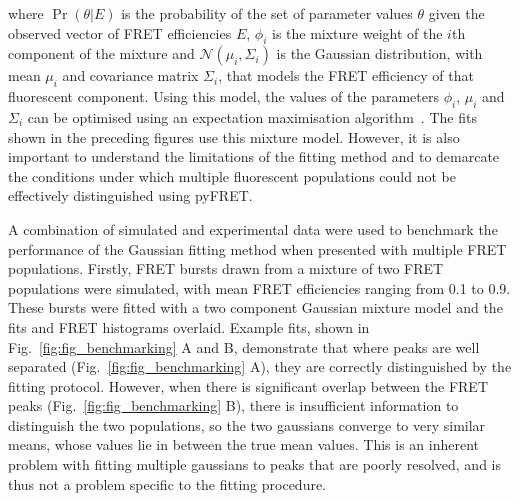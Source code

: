 where $\Pr(\theta|E)$ is the probability of the set of parameter values $\theta$ given the observed vector of FRET efficiencies $E$, $\phi_i$ is the mixture weight of the $i$th component of the mixture and $\mathcal{N}(\mu_i, \Sigma_i)$ is the Gaussian distribution, with mean $\mu_i$ and covariance matrix $\Sigma_i$, that models the FRET efficiency of that fluorescent component. Using this model, the values of the parameters $\phi_i$, $\mu_i$ and $\Sigma_i$ can be optimised using an expectation maximisation algorithm~\cite{Guoshen2012}. The fits shown in the preceding figures use this mixture model. However, it is also important to understand the limitations of the fitting method and to demarcate the conditions under which multiple fluorescent populations could not be effectively distinguished using pyFRET. 

A combination of simulated and experimental data were used to benchmark the performance of the Gaussian fitting method when presented with multiple FRET populations. Firstly, FRET bursts drawn from a mixture of two FRET populations were simulated, with mean FRET efficiencies ranging from 0.1 to 0.9. These bursts were fitted with a two component Gaussian mixture model and the fits and FRET histograms overlaid. Example fits, shown in Fig.~\ref{fig:fig_benchmarking} A and B, demonstrate that where peaks are well separated (Fig.~\ref{fig:fig_benchmarking} A), they are correctly distinguished by the fitting protocol. However, when there is significant overlap between the FRET peaks (Fig.~\ref{fig:fig_benchmarking} B), there is insufficient information to distinguish the two populations, so the two gaussians converge to very similar means, whose values lie in between the true mean values. This is an inherent problem with fitting multiple gaussians to peaks that are poorly resolved, and is thus not a problem specific to the fitting procedure.


